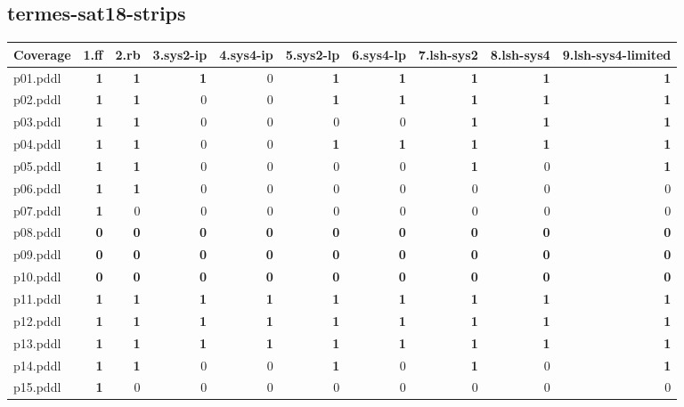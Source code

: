 \documentclass{article}
\begin{document}
\hypertarget{coverage-termes-sat18-strips}{}
\subsection*{termes-sat18-strips}

\begin{tabular}{@{}lrrrrrrrrr@{}}
Coverage & 1.ff & 2.rb & 3.sys2-ip & 4.sys4-ip & 5.sys2-lp & 6.sys4-lp & 7.lsh-sys2 & 8.lsh-sys4 & 9.lsh-sys4-limited \\
\midrule
p01.pddl & \textbf{1} & \textbf{1} & \textbf{1} & 0 & \textbf{1} & \textbf{1} & \textbf{1} & \textbf{1} & \textbf{1} \\
p02.pddl & \textbf{1} & \textbf{1} & 0 & 0 & \textbf{1} & \textbf{1} & \textbf{1} & \textbf{1} & \textbf{1} \\
p03.pddl & \textbf{1} & \textbf{1} & 0 & 0 & 0 & 0 & \textbf{1} & \textbf{1} & \textbf{1} \\
p04.pddl & \textbf{1} & \textbf{1} & 0 & 0 & \textbf{1} & \textbf{1} & \textbf{1} & \textbf{1} & \textbf{1} \\
p05.pddl & \textbf{1} & \textbf{1} & 0 & 0 & 0 & 0 & \textbf{1} & 0 & \textbf{1} \\
p06.pddl & \textbf{1} & \textbf{1} & 0 & 0 & 0 & 0 & 0 & 0 & 0 \\
p07.pddl & \textbf{1} & 0 & 0 & 0 & 0 & 0 & 0 & 0 & 0 \\
p08.pddl & \textbf{0} & \textbf{0} & \textbf{0} & \textbf{0} & \textbf{0} & \textbf{0} & \textbf{0} & \textbf{0} & \textbf{0} \\
p09.pddl & \textbf{0} & \textbf{0} & \textbf{0} & \textbf{0} & \textbf{0} & \textbf{0} & \textbf{0} & \textbf{0} & \textbf{0} \\
p10.pddl & \textbf{0} & \textbf{0} & \textbf{0} & \textbf{0} & \textbf{0} & \textbf{0} & \textbf{0} & \textbf{0} & \textbf{0} \\
p11.pddl & \textbf{1} & \textbf{1} & \textbf{1} & \textbf{1} & \textbf{1} & \textbf{1} & \textbf{1} & \textbf{1} & \textbf{1} \\
p12.pddl & \textbf{1} & \textbf{1} & \textbf{1} & \textbf{1} & \textbf{1} & \textbf{1} & \textbf{1} & \textbf{1} & \textbf{1} \\
p13.pddl & \textbf{1} & \textbf{1} & \textbf{1} & \textbf{1} & \textbf{1} & \textbf{1} & \textbf{1} & \textbf{1} & \textbf{1} \\
p14.pddl & \textbf{1} & \textbf{1} & 0 & 0 & \textbf{1} & 0 & \textbf{1} & 0 & \textbf{1} \\
p15.pddl & \textbf{1} & 0 & 0 & 0 & 0 & 0 & 0 & 0 & 0 \\

\end{tabular}
\end{document}
